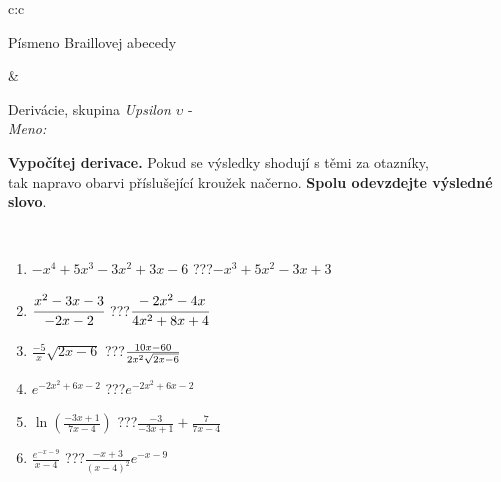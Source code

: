 \documentclass[10pt]{report}
\begin{document}
\begin{tabular}{c:c}
\begin{minipage}[c][104.5mm][t]{0.5\linewidth}
\begin{center}
\begin{minipage}{0.20\linewidth}
\begin{center}
{\small Písmeno Braillovej abecedy}
\end{center}
\end{minipage}
\end{center}
\end{minipage}
&
\begin{minipage}[c][104.5mm][t]{0.5\linewidth}
\begin{center}
\vspace{7mm}
{\huge Derivácie, skupina \textit{Upsilon $\upsilon$} -}\\[5mm]
\textit{Meno:}\phantom{xxxxxxxxxxxxxxxxxxxxxxxxxxxxxxxxxxxxxxxxxxxxxxxxxxxxxxxxxxxxxxxxx}\\[5mm]
\begin{minipage}{0.95\linewidth}
\begin{center}
\textbf{Vypočítej derivace.} Pokud se výsledky shodují s těmi za otazníky,\\tak napravo obarvi příslušející kroužek načerno. \textbf{Spolu odevzdejte výsledné slovo}.
\end{center}
\end{minipage}
\\[1mm]
\begin{minipage}{0.79\linewidth}
\begin{center}
\begin{varwidth}{\linewidth}
\begin{enumerate}
\normalsize
\item $-x^4+5x^3-3x^2+3x-6$\quad \dotfill\; ???\;\dotfill \quad $-x^3+5x^2-3x+3$
\item $\cfrac{x^2-3x-3}{-2x-2}$\quad \dotfill\; ???\;\dotfill \quad $\cfrac{-2x^2-4x}{4x^2+8x+4}$
\item $\frac{-5}{x}\sqrt{2x-6}$\quad \dotfill\; ???\;\dotfill \quad $\frac{10x-60}{2x^2 \sqrt{\smash[b]{2x-6}}}$
\item $e^{-2x^2+6x-2}$\quad \dotfill\; ???\;\dotfill \quad $e^{-2x^2+6x-2}$
\item $\ln{\left(\frac{-3x+1}{7x-4}\right)}$\quad \dotfill\; ???\;\dotfill \quad $\frac{-3}{-3x+1}+\frac{7}{7x-4}$
\item $\frac{e^{-x-9}}{x-4}$\quad \dotfill\; ???\;\dotfill \quad $\frac{-x+3}{(x-4)^2}e^{-x-9}$
\end{enumerate}
\end{varwidth}
\end{center}
\end{minipage}
\begin{minipage}{0.20\linewidth}
\begin{center}

\end{center}
\end{minipage}
\end{center}
\end{minipage}
\end{tabular}
\end{document}

